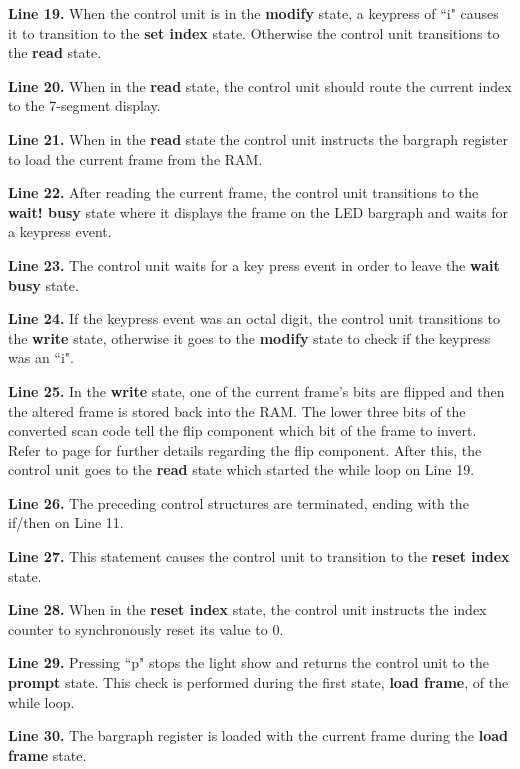 \textbf{ Line 19.} When the control unit is in the \textbf{ modify} state, a keypress of ``i"
causes it to transition to the \textbf{ set index} state.  Otherwise the control
unit transitions to the \textbf{ read} state.

\textbf{ Line 20.} When in the \textbf{ read} state, the control unit should route the current
index to the 7-segment display.

\textbf{ Line 21.} When in the \textbf{ read} state the control unit instructs the bargraph register
to load the current frame from the RAM.

\textbf{ Line 22.} After reading the current frame, the control unit transitions
to the \textbf{ wait! busy} state where it displays the frame on the LED bargraph
and waits for a keypress event.

\textbf{ Line 23.} The control unit waits for a key press event in order
to leave the \textbf{ wait busy} state.

\textbf{ Line 24.} If the keypress event was an octal digit, the control
unit transitions to the \textbf{ write} state, otherwise it goes to the
\textbf{ modify} state to check if the keypress was an ``i".

\textbf{ Line 25.}  In the \textbf{ write} state, one of the current frame's
bits are flipped and then the altered frame is stored back into the
RAM.  The lower three bits of the converted scan code tell the flip
component which bit of the frame to invert.  Refer to
page \pageref{page:flipbox} for further details regarding the flip
component.  After this, the control unit goes to the \textbf{ read} state
which started the while loop on Line 19.

\textbf{ Line 26.} The preceding control structures are terminated, ending with the if/then on Line 11.

\textbf{ Line 27.} This statement causes the control unit to transition to the
\textbf{ reset index} state.

\textbf{ Line 28.} When in the \textbf{ reset index} state, the control unit instructs the index
counter to synchronously reset its value to 0.

\textbf{ Line 29.} Pressing ``p" stops the light show and returns the control unit to the
\textbf{ prompt} state.  This check is performed during the first state, \textbf{ load frame},
of the while loop.

\textbf{ Line 30.} The bargraph register is loaded with the current frame during the
\textbf{ load frame} state.

